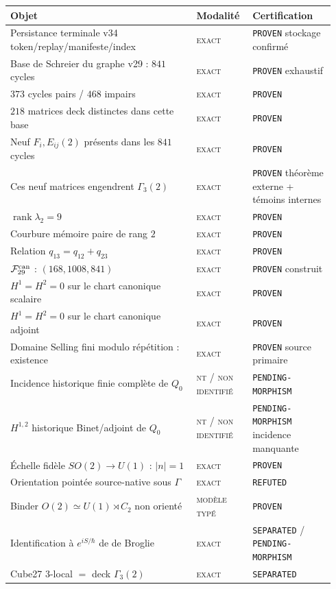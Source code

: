 \documentclass[11pt,a4paper]{article}
\newcommand{\rank}{\operatorname{rank}}
\newcommand{\statusExact}{\textsc{exact}}
\newcommand{\statusTyped}{\textsc{modèle typé}}
\newcommand{\statusNT}{\textsc{nt / non identifié}}
\newcommand{\certProven}{\texttt{PROVEN}}
\newcommand{\certRefuted}{\texttt{REFUTED}}
\newcommand{\certSeparated}{\texttt{SEPARATED}}
\newcommand{\certPending}{\texttt{PENDING-MORPHISM}}
\begin{document}
\begin{longtable}{@{}p{0.54\linewidth}p{0.16\linewidth}p{0.24\linewidth}@{}}
\toprule
Objet & Modalit\'e & Certification\\
\midrule\endhead
Persistance terminale v34 token/replay/manifeste/index & \statusExact & \certProven{} stockage confirm\'e\\
Base de Schreier du graphe v29 : $841$ cycles & \statusExact & \certProven{} exhaustif\\
$373$ cycles pairs / $468$ impairs & \statusExact & \certProven\\
$218$ matrices deck distinctes dans cette base & \statusExact & \certProven\\
Neuf $F_i,E_{ij}(2)$ pr\'esents dans les $841$ cycles & \statusExact & \certProven\\
Ces neuf matrices engendrent $\Gamma_3(2)$ & \statusExact & \certProven{} th\'eor\`eme externe + t\'emoins internes\\
$\rank\lambda_2=9$ & \statusExact & \certProven\\
Courbure m\'emoire paire de rang $2$ & \statusExact & \certProven\\
Relation $q_{13}=q_{12}+q_{23}$ & \statusExact & \certProven\\
$\mathcal F_{29}^{\rm can}$ : $(168,1008,841)$ & \statusExact & \certProven{} construit\\
$H^1=H^2=0$ sur le chart canonique scalaire & \statusExact & \certProven\\
$H^1=H^2=0$ sur le chart canonique adjoint & \statusExact & \certProven\\
Domaine Selling fini modulo r\'ep\'etition : existence & \statusExact & \certProven{} source primaire\\
Incidence historique finie compl\`ete de $Q_0$ & \statusNT & \certPending\\
$H^{1,2}$ historique Binet/adjoint de $Q_0$ & \statusNT & \certPending{} incidence manquante\\
\'Echelle fid\`ele $SO(2)\to U(1)$ : $|n|=1$ & \statusExact & \certProven\\
Orientation point\'ee source-native sous $\Gamma$ & \statusExact & \certRefuted\\
Binder $O(2)\simeq U(1)\rtimes C_2$ non orient\'e & \statusTyped & \certProven\\
Identification \`a $e^{iS/\hbar}$ de de Broglie & \statusExact & \certSeparated{} / \certPending\\
Cube27 $3$-local $=$ deck $\Gamma_3(2)$ & \statusExact & \certSeparated\\
\bottomrule
\end{longtable}
\end{document}
